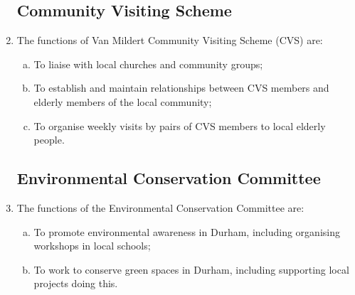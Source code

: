 \documentclass[12pt]{article}
\begin{document}
\begin{enumerate}
    \subsection{Community Visiting Scheme}
    \item The functions of Van Mildert Community Visiting Scheme (CVS) are:
    \begin{enumerate}[(a)]
        \item To liaise with local churches and community groups;
        \item To establish and maintain relationships between CVS members and elderly members of the local community;
        \item To organise weekly visits by pairs of CVS members to local elderly people.
    \end{enumerate}
    \subsection{Environmental Conservation Committee}
    \item The functions of the Environmental Conservation Committee are:
    \begin{enumerate}[(a)]
        \item To promote environmental awareness in Durham, including organising workshops in local schools;
        \item To work to conserve green spaces in Durham, including supporting local projects doing this.
    \end{enumerate}

\end{enumerate}
\end{document}
